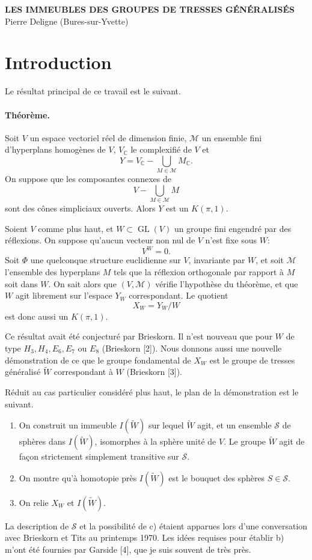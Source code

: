 \documentclass[10pt,a4paper]{article}
\newcommand{\C}{\mathbb C}
\newcommand{\GL}{\operatorname{GL}}
\newcommand{\mcA}{\mathcal M}
\newcommand{\mcS}{\mathcal S}
\begin{document}
\begin{center}
{\Large\bfseries LES IMMEUBLES DES GROUPES DE TRESSES GÉNÉRALISÉS}\\[0.4em]
Pierre Deligne (Bures-sur-Yvette)
\end{center}

\section*{Introduction}

Le résultat principal de ce travail est le suivant.

\paragraph{Théorème.} Soit $V$ un espace vectoriel réel de dimension finie, $\mcA$ un ensemble fini d'hyperplans homogènes de $V$, $V_\C$ le complexifié de $V$ et
\[
Y=V_\C-\bigcup_{M\in\mcA}M_\C.
\]
On suppose que les composantes connexes de
\[
V-\bigcup_{M\in\mcA}M
\]
sont des cônes simpliciaux ouverts. Alors $Y$ est un $K(\pi,1)$.

Soient $V$ comme plus haut, et $W\subset \GL(V)$ un groupe fini engendré par des réflexions. On suppose qu'aucun vecteur non nul de $V$ n'est fixe sous $W$:
\[
V^W=0.
\]
Soit $\Phi$ une quelconque structure euclidienne sur $V$, invariante par $W$, et soit $\mcA$ l'ensemble des hyperplans $M$ tels que la réflexion orthogonale par rapport à $M$ soit dans $W$. On sait alors que $(V,\mcA)$ vérifie l'hypothèse du théorème, et que $W$ agit librement sur l'espace $Y_W$ correspondant. Le quotient
\[
X_W=Y_W/W
\]
est donc aussi un $K(\pi,1)$.

Ce résultat avait été conjecturé par Brieskorn. Il n'est nouveau que pour $W$ de type $H_3,H_4,E_6,E_7$ ou $E_8$ (Brieskorn [2]). Nous donnons aussi une nouvelle démonstration de ce que le groupe fondamental de $X_W$ est le groupe de tresses généralisé $\widetilde W$ correspondant à $W$ (Brieskorn [3]).

Réduit au cas particulier considéré plus haut, le plan de la démonstration est le suivant.
\begin{enumerate}[label=\alph*)]
\item On construit un immeuble $I(\widetilde W)$ sur lequel $\widetilde W$ agit, et un ensemble $\mcS$ de sphères dans $I(\widetilde W)$, isomorphes à la sphère unité de $V$. Le groupe $\widetilde W$ agit de façon strictement simplement transitive sur $\mcS$.
\item On montre qu'à homotopie près $I(\widetilde W)$ est le bouquet des sphères $S\in\mcS$.
\item On relie $X_W$ et $I(\widetilde W)$.
\end{enumerate}
La description de $\mcS$ et la possibilité de c) étaient apparues lors d'une conversation avec Brieskorn et Tits au printemps 1970. Les idées requises pour établir b) m'ont été fournies par Garside [4], que je suis souvent de très près.
\end{document}
